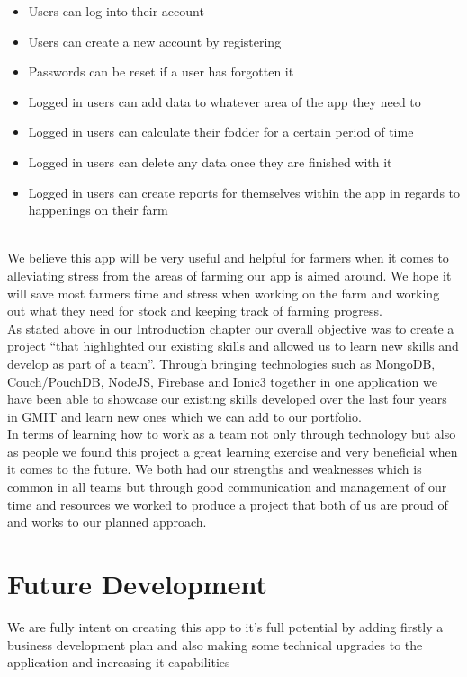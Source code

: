\documentclass[12pt,a4paper,oneside,openany]{book}
\begin{document}
\begin{itemize}
    \item Users can log into their account
    \item Users can create a new account by registering
    \item Passwords can be reset if a user has forgotten it
    \item Logged in users can add data to whatever area of the app they need to
    \item Logged in users can calculate their fodder for a certain period of time
    \item Logged in users can delete any data once they are finished with it
    \item Logged in users can create reports for themselves within the app in regards to happenings on their farm
\end{itemize}
\\
We believe this app will be very useful and helpful for farmers when it comes to alleviating stress from the areas of farming our app is aimed around. We hope it will save most farmers time and stress when working on the farm and working out what they need for stock and keeping track of farming progress. \\

\noindent As stated above in our Introduction chapter our overall objective was to create a project “that highlighted our existing skills and allowed us to learn new skills and develop as part of a team”. Through bringing technologies such as MongoDB, Couch/PouchDB, NodeJS, Firebase and Ionic3 together in one application we have been able to showcase our existing skills developed over the last four years in GMIT and learn new ones which we can add to our portfolio.\\

\noindent In terms of learning how to work as a team not only through technology but also as people we found this project a great learning exercise and very beneficial when it comes to the future. We both had our strengths and weaknesses which is common in all teams but through good communication and management of our time and resources we worked to produce a project that both of us are proud of and works to our planned approach.

\section{Future Development}
We are fully intent on creating this app to it's full potential by adding firstly a business development plan and also making some technical upgrades to the application and increasing it capabilities
\end{document}
